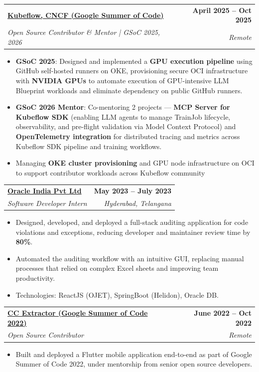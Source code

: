 \documentclass[letterpaper,11pt]{article}
\makeatletter
\newcommand{\resumeItem}[1]{
  \item\small{
    {#1 \vspace{-4pt}}
  }
}
\newcommand{\resumeSubheading}[4]{
  \vspace{-2pt}\item
    \begin{tabular*}{1.0\textwidth}[t]{l@{\extracolsep{\fill}}r}
      \textbf{#1} & \textbf{\small #2} \\
      \textit{\small#3} & \textit{\small #4} \\
    \end{tabular*}\vspace{-8pt}
}
\newcommand{\resumeItemListStart}{\begin{itemize}}
\newcommand{\resumeItemListEnd}{\end{itemize}\vspace{-5pt}}
\makeatother
\begin{document}
  \resumeSubheading
  {\href{https://summerofcode.withgoogle.com/programs/2025/projects/fwZkvPr0}{Kubeflow, CNCF (Google Summer of Code)}}{April 2025 -- Oct 2025}
  {Open Source Contributor \& Mentor | GSoC 2025, 2026}{Remote}
  \resumeItemListStart
    \resumeItem{\textbf{GSoC 2025}: Designed and implemented a \textbf{GPU execution pipeline} using GitHub self-hosted runners on OKE, provisioning secure OCI infrastructure with \textbf{NVIDIA GPUs} to automate execution of GPU-intensive LLM Blueprint workloads and eliminate dependency on public GitHub runners.}
    \resumeItem{\textbf{GSoC 2026 Mentor}: Co-mentoring 2 projects — \textbf{MCP Server for Kubeflow SDK} (enabling LLM agents to manage TrainJob lifecycle, observability, and pre-flight validation via Model Context Protocol) and \textbf{OpenTelemetry integration} for distributed tracing and metrics across Kubeflow SDK pipeline and training workflows.}
    \resumeItem{Managing \textbf{OKE cluster provisioning} and GPU node infrastructure on OCI to support contributor workloads across Kubeflow community}
  \resumeItemListEnd


    \resumeSubheading
    {\href{https://drive.google.com/file/d/108neUmfJqgKASZ2P7VFuHIYA8RGoLkk_/view?usp=drive_link}{Oracle India Pvt Ltd}}{May 2023 -- July 2023}
      {Software Developer Intern}{Hyderabad, Telangana}
      \resumeItemListStart
        \resumeItem{Designed, developed, and deployed a full-stack auditing application for code violations and exceptions, reducing developer and maintainer review time by \textbf{80\%}.}
        \resumeItem{Automated the auditing workflow with an intuitive GUI, replacing manual processes that relied on complex Excel sheets and improving team productivity.}
        \resumeItem{Technologies: ReactJS (OJET), SpringBoot (Helidon), Oracle DB.}
      \resumeItemListEnd


    \resumeSubheading
    {\href{https://www.linkedin.com/feed/update/urn:li:activity:6933613937011617792/}{CC Extractor (Google Summer of Code 2022)}}{June 2022 -- Oct 2022}
      {Open Source Contributor}{Remote}
      \resumeItemListStart
        \resumeItem{Built and deployed a Flutter mobile application end-to-end as part of Google Summer of Code 2022, under mentorship from senior open source developers.}
      \resumeItemListEnd
\vspace{-10pt}
\end{document}
